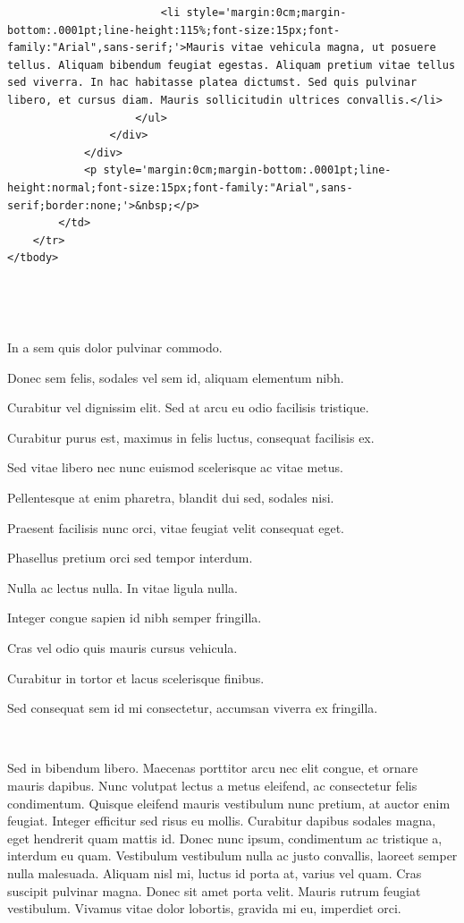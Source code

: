 \documentclass[
]{book}
\begin{document}
\begin{verbatim}
                        <li style='margin:0cm;margin-bottom:.0001pt;line-height:115%;font-size:15px;font-family:"Arial",sans-serif;'>Mauris vitae vehicula magna, ut posuere tellus. Aliquam bibendum feugiat egestas. Aliquam pretium vitae tellus sed viverra. In hac habitasse platea dictumst. Sed quis pulvinar libero, et cursus diam. Mauris sollicitudin ultrices convallis.</li>
                    </ul>
                </div>
            </div>
            <p style='margin:0cm;margin-bottom:.0001pt;line-height:normal;font-size:15px;font-family:"Arial",sans-serif;border:none;'>&nbsp;</p>
        </td>
    </tr>
</tbody>
\end{verbatim}

~

~

In a sem quis dolor pulvinar commodo.

Donec sem felis, sodales vel sem id, aliquam elementum nibh.

Curabitur vel dignissim elit. Sed at arcu eu odio facilisis tristique.

Curabitur purus est, maximus in felis luctus, consequat facilisis ex.

Sed vitae libero nec nunc euismod scelerisque ac vitae metus.

Pellentesque at enim pharetra, blandit dui sed, sodales nisi.

Praesent facilisis nunc orci, vitae feugiat velit consequat eget.

Phasellus pretium orci sed tempor interdum.

Nulla ac lectus nulla. In vitae ligula nulla.

Integer congue sapien id nibh semper fringilla.

Cras vel odio quis mauris cursus vehicula.

Curabitur in tortor et lacus scelerisque finibus.

Sed consequat sem id mi consectetur, accumsan viverra ex fringilla.

~

Sed in bibendum libero. Maecenas porttitor arcu nec elit congue, et ornare mauris dapibus. Nunc volutpat lectus a metus eleifend, ac consectetur felis condimentum. Quisque eleifend mauris vestibulum nunc pretium, at auctor enim feugiat. Integer efficitur sed risus eu mollis. Curabitur dapibus sodales magna, eget hendrerit quam mattis id. Donec nunc ipsum, condimentum ac tristique a, interdum eu quam. Vestibulum vestibulum nulla ac justo convallis, laoreet semper nulla malesuada. Aliquam nisl mi, luctus id porta at, varius vel quam. Cras suscipit pulvinar magna. Donec sit amet porta velit. Mauris rutrum feugiat vestibulum. Vivamus vitae dolor lobortis, gravida mi eu, imperdiet orci.
\end{document}
